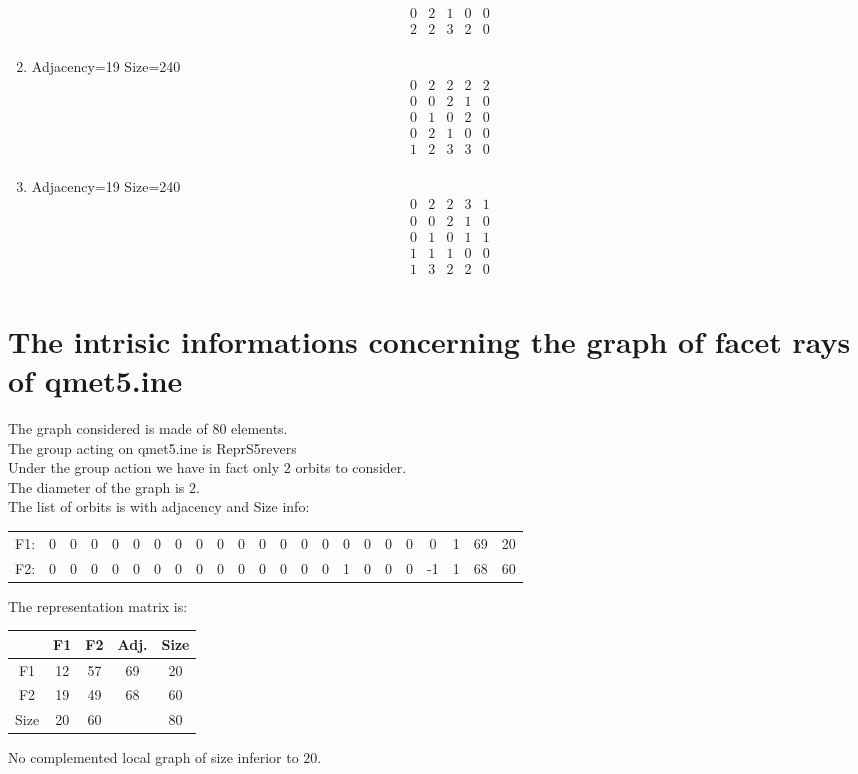 \documentclass[12pt]{article}
\begin{document}
\begin{multicols}{3}
\begin{enumerate}
\begin{equation*}
\begin{array}{ccccc}
0&2&1&0&0\\
2&2&3&2&0\\
\end{array}
\end{equation*}
\item Adjacency=19 Size=240
\begin{equation*}
\begin{array}{ccccc}
0&2&2&2&2\\
0&0&2&1&0\\
0&1&0&2&0\\
0&2&1&0&0\\
1&2&3&3&0\\
\end{array}
\end{equation*}
\item Adjacency=19 Size=240
\begin{equation*}
\begin{array}{ccccc}
0&2&2&3&1\\
0&0&2&1&0\\
0&1&0&1&1\\
1&1&1&0&0\\
1&3&2&2&0\\
\end{array}
\end{equation*}
\end{enumerate}
\end{multicols}



\section{The intrisic informations concerning the graph of facet rays of qmet5.ine}
The graph considered is made of $80$ elements.\\
The group acting on qmet5.ine is ReprS5revers\\
Under the group action we have in fact only $2$ orbits to consider.\\
The diameter of the graph is $2$.\\
The list of orbits is with adjacency and Size info:
\begin{center}
\scriptsize
\begin{tabular}{ccccccccccccccccccccc|c|c}
F1:&0&0&0&0&0&0&0&0&0&0&0&0&0&0&0&0&0&0&0&1&69&20\\
F2:&0&0&0&0&0&0&0&0&0&0&0&0&0&0&1&0&0&0&-1&1&68&60\\
\end{tabular}
\end{center}
The representation matrix is:
\begin{center}
\scriptsize
\begin{tabular}{|c|cc|c|c|}
\hline
&F1&F2&Adj.&Size\\
\hline
F1& 12& 57&69&20\\
F2& 19& 49&68&60\\
\hline
Size&20&60&&80\\
\hline
\end{tabular}
\end{center}
No complemented local graph of size inferior to $20$.
\end{document}
